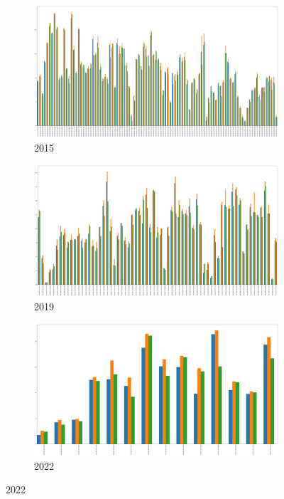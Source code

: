 \begin{figure}[h]
	\centering
	\caption{Before, after and daily ISI maximum value}
	\begin{subfigure}{0.45\textwidth}
		\centering
		\includegraphics[width=\textwidth]{graphs/2015/byHour/ISI_max_before_after.png}
		\caption{2015}
	\end{subfigure}
	\hfill
	\begin{subfigure}{0.45\textwidth}
		\centering
		\includegraphics[width=\textwidth]{graphs/2019/byHour/ISI_max_before_after.png}
		\caption{2019}
	\end{subfigure}
	\hfill
	\begin{subfigure}{0.45\textwidth}
		\centering
		\includegraphics[width=\textwidth]{graphs/2022/ISI_max_before_after.png}
		\caption{2022}
	\end{subfigure}
	\label{fig:daily_isi_after_before_max}
\end{figure}

